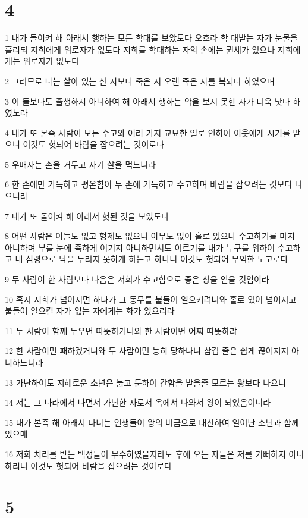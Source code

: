 \chapter{4}

\par 1 내가 돌이켜 해 아래서 행하는 모든 학대를 보았도다 오호라 학 대받는 자가 눈물을 흘리되 저희에게 위로자가 없도다 저희를 학대하는 자의 손에는 권세가 있으나 저희에게는 위로자가 없도다
\par 2 그러므로 나는 살아 있는 산 자보다 죽은 지 오랜 죽은 자를 복되다 하였으며
\par 3 이 둘보다도 출생하지 아니하여 해 아래서 행하는 악을 보지 못한 자가 더욱 낫다 하였노라
\par 4 내가 또 본즉 사람이 모든 수고와 여러 가지 교묘한 일로 인하여 이웃에게 시기를 받으니 이것도 헛되어 바람을 잡으려는 것이로다
\par 5 우매자는 손을 거두고 자기 살을 먹느니라
\par 6 한 손에만 가득하고 평온함이 두 손에 가득하고 수고하며 바람을 잡으려는 것보다 나으니라
\par 7 내가 또 돌이켜 해 아래서 헛된 것을 보았도다
\par 8 어떤 사람은 아들도 없고 형제도 없으니 아무도 없이 홀로 있으나 수고하기를 마지 아니하며 부를 눈에 족하게 여기지 아니하면서도 이르기를 내가 누구를 위하여 수고하고 내 심령으로 낙을 누리지 못하게 하는고 하나니 이것도 헛되어 무익한 노고로다
\par 9 두 사람이 한 사람보다 나음은 저희가 수고함으로 좋은 상을 얻을 것임이라
\par 10 혹시 저희가 넘어지면 하나가 그 동무를 붙들어 일으키려니와 홀로 있어 넘어지고 붙들어 일으킬 자가 없는 자에게는 화가 있으리라
\par 11 두 사람이 함께 누우면 따뜻하거니와 한 사람이면 어찌 따뜻하랴
\par 12 한 사람이면 패하겠거니와 두 사람이면 능히 당하나니 삼겹 줄은 쉽게 끊어지지 아니하느니라
\par 13 가난하여도 지혜로운 소년은 늙고 둔하여 간함을 받을줄 모르는 왕보다 나으니
\par 14 저는 그 나라에서 나면서 가난한 자로서 옥에서 나와서 왕이 되었음이니라
\par 15 내가 본즉 해 아래서 다니는 인생들이 왕의 버금으로 대신하여 일어난 소년과 함께 있으매
\par 16 저희 치리를 받는 백성들이 무수하였을지라도 후에 오는 자들은 저를 기뻐하지 아니하리니 이것도 헛되어 바람을 잡으려는 것이로다

\chapter{5}

